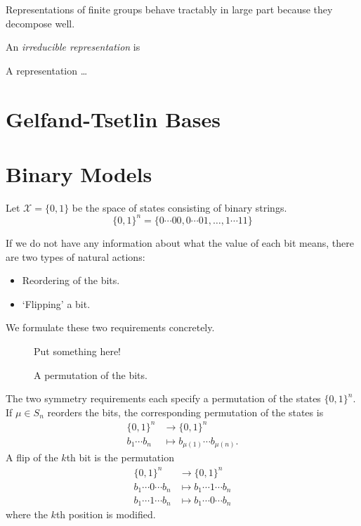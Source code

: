\documentclass[cclicense]{hmcthesis}
\providecommand*{\xs}{\mathcal X}
\numberwithin{equation}{chapter}
\numberwithin{thmcounter}{chapter}
\begin{document}
    Representations of finite groups behave tractably in large part because they
    decompose well.
    \begin{definition}
        An \emph{irreducible representation} is
    \end{definition}
    \begin{theorem}[Maschke]
        A representation \ldots
    \end{theorem}

\section{Gelfand-Tsetlin Bases}

\section{Binary Models}

    Let $\xs = \{0, 1\}$ be the space of states consisting of binary strings.
    \[
        \{0, 1\}^n = \{0\cdots00, 0\cdots01, \ldots, 1\cdots11\}
    \]
    
    If we do not have any information about what the value of each bit means,
    there are two types of natural actions:
    \begin{itemize}\nospace
    \item Reordering of the bits.
    \item `Flipping' a bit.
    \end{itemize}
    We formulate these two requirements concretely.  

    \begin{figure}[H]
        \centering
        Put something here!
        \caption{A permutation of the bits.}
    \end{figure}
    
    The two symmetry requirements each specify a permutation of the states $\{0,
    1\}^n$.  If $\mu \in S_n$ reorders the bits, the corresponding permutation
    of the states is
    \begin{align*}
        \{0, 1\}^n &\to \{0, 1\}^n \\
        b_1 \cdots b_n &\mapsto b_{\mu(1)} \cdots b_{\mu(n)}.
    \end{align*}
    A flip of the $k$th bit is the permutation
    \begin{align*}
        \{0, 1\}^n &\to \{0, 1\}^n \\
        b_1 \cdots 0 \cdots b_n 
        &\mapsto
        b_1 \cdots 1 \cdots b_n  \\
        b_1 \cdots 1 \cdots b_n 
        &\mapsto
        b_1 \cdots 0 \cdots b_n
    \end{align*}
    where the $k$th position is modified.  
    
\end{document}
